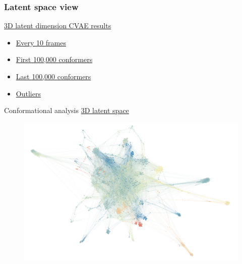 \documentclass{beamer}
\begin{document}
\begin{frame}
\frametitle{Latent space view}  
\href{./Figures/CVAE_3d_plot.html}{3D latent dimension CVAE results }
\begin{itemize}
	\item 
	\href{./Figures/cm_predict.html}{Every 10 frames} 
	\item 
	\href{./Figures/cm_predict_first_100k.html}{First 100,000 conformers}
	\item 
	\href{./Figures/cm_predict_last_100k.html}{Last 100,000 conformers}
	\item 
	\href{./Figures/cm_predict_outliers.html}{Outliers} 
\end{itemize}

\end{frame}


\begin{frame}{Conformational analysis} 
\href{./Figures/cm_predict.html}{3D latent space} 
\begin{figure}
	\includegraphics[width=\linewidth]{Figures/Gephi_save_2k_crop.png} 
\end{figure}
\end{frame}
\end{document}
